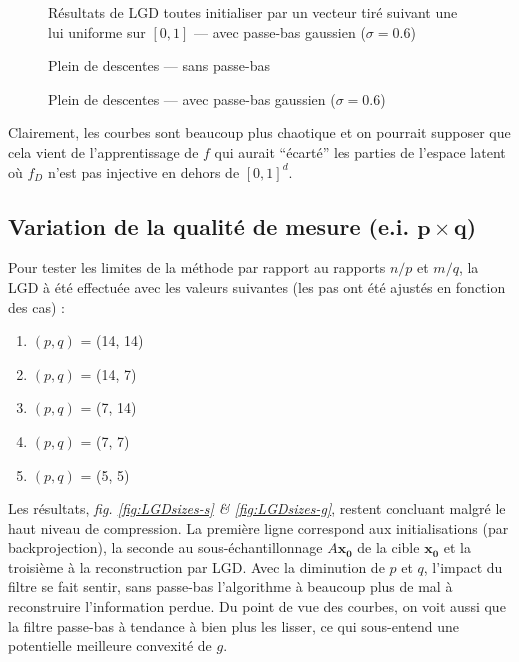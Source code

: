 \documentclass[hidelinks, french]{article} %
\renewcommand{\bf}[1]{\boldsymbol{#1}}
\theoremstyle{enonce}
\theoremstyle{special}
\theoremstyle{rq}
\theoremstyle{exo}
\theoremstyle{demo}
\begin{document}
\begin{figure}[H]\centering
	\caption{Résultats de LGD toutes initialiser par un vecteur tiré suivant une lui uniforme sur $[0,1]$ ---  avec passe-bas gaussien ($\sigma=0.6$)}
	\label{fig:LGDunif-g}
\end{figure}
\begin{figure}[H]\centering
    \caption{Plein de descentes --- sans passe-bas}
    \label{fig:LGDgauss-s}
\end{figure}
\begin{figure}[H]\centering
    \caption{Plein de descentes ---  avec passe-bas gaussien ($\sigma=0.6$)}
    \label{fig:LGDgauss-g}
\end{figure}

\noindent Clairement, les courbes sont beaucoup plus chaotique et on pourrait supposer que cela vient de l'apprentissage de $f$ qui aurait ``écarté'' les parties de l'espace latent où $f_D$ n'est pas injective en dehors de $[0,1]^d$. 


\subsection{Variation de la qualité de mesure (e.i. $\bf{p}\times\bf{q}$)}\label{sec:LGDsize}

Pour tester les limites de la méthode par rapport au rapports $n/p$ et $m/q$, la LGD à été effectuée avec les valeurs suivantes (les pas ont été ajustés en fonction des cas) :
\begin{enumerate}[label=(\arabic*)]
	\item $(p,q)$ = (14, 14)
	\item $(p,q)$ = (14, 7)
	\item $(p,q)$ = (7, 14)
	\item $(p,q)$ = (7, 7)
	\item $(p,q)$ = (5, 5)
\end{enumerate}

Les résultats, \textit{fig. \ref{fig:LGDsizes-s} \& \ref{fig:LGDsizes-g}}, restent concluant malgré le haut niveau de compression. La première ligne correspond aux initialisations (par backprojection), la seconde au sous-échantillonnage $A\bf{x_0}$ de la cible $\bf{x_0}$ et la troisième à la reconstruction par LGD. Avec la diminution de $p$ et $q$, l'impact du filtre se fait sentir, sans passe-bas l'algorithme à beaucoup plus de mal à reconstruire l'information perdue. Du point de vue des courbes, on voit aussi que la filtre passe-bas à tendance à bien plus les lisser, ce qui sous-entend une potentielle meilleure convexité de $g$.
\end{document}

